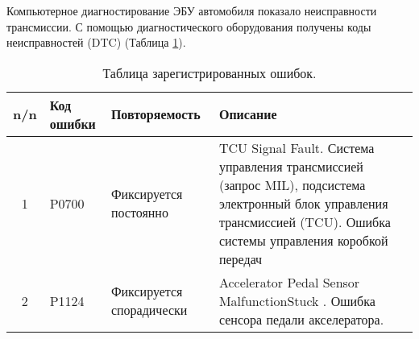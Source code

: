 %

Компьютерное диагностирование ЭБУ автомобиля показало неисправности трансмиссии.
С помощью диагностического оборудования получены  коды неисправностей (DTC) (Таблица \ref{table:ошибки}). 
\vspace{3mm}

\begin{table}[h]
    \caption{Таблица зарегистрированных ошибок.}
    \label{table:ошибки}
    \begin{tabular}{c|m{45mm}|m{35mm}|m{63mm}}\hline
      \textbf{  n/n} & \textbf{Код ошибки} & \textbf{Повторяемость} & \textbf{Описание} \\
        \hline 
        1 & P0700 & Фиксируется постоянно & TCU Signal Fault. Система управления трансмиссией (запрос MIL), подсистема электронный блок управления трансмиссией (TCU). Ошибка системы управления коробкой передач \\
        \hline
        2 & P1124 & Фиксируется спорадически & Accelerator Pedal Sensor MalfunctionStuck . Ошибка сенсора педали акселератора.\\ \hline
    \end{tabular}
\end{table}

